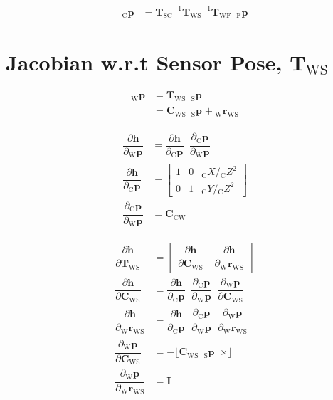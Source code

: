 \documentclass{report}
\renewcommand{\Vec}[1]{{\mathbf{#1}}}
\newcommand{\Mat}[1]{{\mathbf{#1}}}
\newcommand{\I}{{\Mat{I}}}
\newcommand{\Skew}[1]{{\lfloor #1 \enspace \times \rfloor}}
\newcommand{\tf}{\mathbf{T}}
\newcommand{\cam}{{\text{C}}}
\newcommand{\sensor}{{\text{S}}}
\newcommand{\world}{{\text{W}}}
\newcommand{\fiducial}{{\text{F}}}
\newcommand{\KineNotationTransform}[3]{{{#1}_{#2#3}}}
\newcommand{\KineNotation}[3]{{{{}_{#2}} {#1}_{#2#3}}}
\newcommand{\KineNotationPart}[3]{{{{}_{#2}} {#1}_{#3}}}
\newcommand{\KineNotationBare}[2]{{{{}_{#2}} {#1}}}
\newcommand{\pos}{{\Vec{r}}}
\newcommand{\Pos}[2]{{\KineNotation{\pos}{#1}{#2}}}
\newcommand{\rot}{{\Mat{C}}}
\newcommand{\Rot}[2]{{\KineNotationTransform{\rot}{#1}{#2}}}
\newcommand{\tf}{{\Mat{T}}}
\newcommand{\Tf}[2]{{\KineNotationTransform{\tf}{#1}{#2}}}
\newcommand{\point}{\Vec{p}}
\newcommand{\Pt}[1]{{\KineNotationPart{\point}{#1}{}}}
\newcommand{\Point}[2]{{\KineNotationBare{\point}{#1}}}
\newcommand{\projFunc}{{\Vec{h}}}
\begin{document}
\begin{align}
  \Point{\cam}{\fiducial_{ij}}
  &=
  \Tf{\sensor}{\cam}^{-1}
  \Tf{\world}{\sensor}^{-1}
  \Tf{\world}{\fiducial}
  \enspace \Point{\fiducial}{\fiducial_{ij}}
\end{align}



\section{Jacobian w.r.t Sensor Pose, $\Tf{\world}{\sensor}$}

\begin{align}
  \Point{\world}{\fiducial_{ij}}
  &=
    \Tf{\world}{\sensor}
    \enspace \Pt{\sensor} \\
  &=
    \Rot{\world}{\sensor}
    \enspace \Pt{\sensor}
		+ \Pos{\world}{\sensor}
\end{align}

\begin{align}
  \dfrac{\partial{\projFunc}}{\partial{\Pt{\world}}}
		&= \dfrac{\partial{\projFunc}}{\partial{\Pt{\cam}}}
			 \enspace
			 \dfrac{\partial{\Pt{\cam}}}{\partial{\Pt{\world}}} \\
  \dfrac{\partial{\projFunc}}{\partial{\Pt{\cam}}}
		&=
			\begin{bmatrix}
				1 & 0 & \KineNotationBare{X}{\cam} / \KineNotationBare{Z}{\cam}^{2} \\
				0 & 1 & \KineNotationBare{Y}{\cam} / \KineNotationBare{Z}{\cam}^{2}
			\end{bmatrix} \\
  \dfrac{\partial{\Pt{\cam}}}{\partial{\Pt{\world}}}
		&= \Rot{\cam}{\world}
\end{align}

\begin{align}
  \dfrac{\partial{\projFunc}}{\partial{\Tf{\world}{\sensor}}}
    &=
		\begin{bmatrix}
			\dfrac{\partial{\projFunc}}{\partial{\Rot{\world}{\sensor}}}
			\quad
			\dfrac{\partial{\projFunc}}{\partial{\Pos{\world}{\sensor}}}
		\end{bmatrix} \\
  \dfrac{\partial{\projFunc}}{\partial{\Rot{\world}{\sensor}}}
    &= \dfrac{\partial{\projFunc}}{\partial{\Pt{\cam}}}
			 \enspace
       \dfrac{\partial{\Pt{\cam}}}{\partial{\Pt{\world}}}
			 \enspace
       \dfrac{\partial{\Pt{\world}}}{\partial{\Rot{\world}{\sensor}}} \\
  \dfrac{\partial{\projFunc}}{\partial{\Pos{\world}{\sensor}}}
    &= \dfrac{\partial{\projFunc}}{\partial{\Pt{\cam}}}
			 \enspace
       \dfrac{\partial{\Pt{\cam}}}{\partial{\Pt{\world}}}
			 \enspace
       \dfrac{\partial{\Pt{\world}}}{\partial{\Pos{\world}{\sensor}}} \\
	\dfrac{\partial{\Pt{\world}}}{\partial{\Rot{\world}{\sensor}}}
		&= -\Skew{\Rot{\world}{\sensor} \enspace \Pt{\sensor}} \\
	\dfrac{\partial{\Pt{\world}}}{\partial{\Pos{\world}{\sensor}}}
		&= \I
\end{align}
\end{document}
